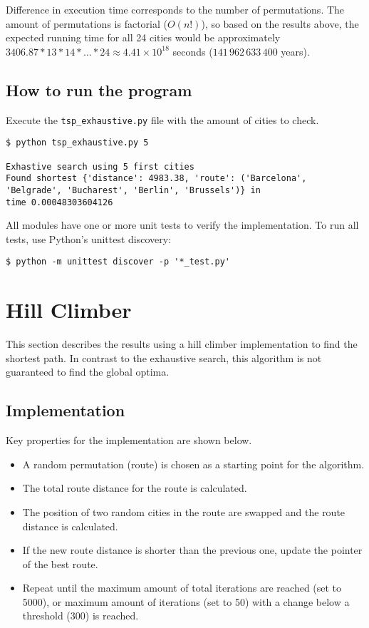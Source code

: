 \documentclass{article}
\begin{document}
\noindent Difference in execution time corresponds to the number of permutations. The amount of permutations is factorial ($O(n!)$), so based on the results above, the expected running time for all 24 cities would be approximately $3406.87 * 13 * 14 * \ldots * 24 \approx 4.41 \times 10^{18}$ seconds ($141\,962\,633\,400$ years).

\subsection*{How to run the program}

Execute the \texttt{tsp\_exhaustive.py} file with the amount of cities to check.

\begin{verbatim}
$ python tsp_exhaustive.py 5

Exhastive search using 5 first cities
Found shortest {'distance': 4983.38, 'route': ('Barcelona',
'Belgrade', 'Bucharest', 'Berlin', 'Brussels')} in
time 0.00048303604126
\end{verbatim}

\noindent All modules have one or more unit tests to verify the implementation. To run all tests, use Python's unittest discovery:

\begin{verbatim}
$ python -m unittest discover -p '*_test.py'
\end{verbatim}

\section*{Hill Climber}

This section describes the results using a hill climber implementation to find the shortest path. In contrast to the exhaustive search, this algorithm is not guaranteed to find the global optima.

\subsection*{Implementation}

Key properties for the implementation are shown below.

\begin{itemize}
    \item A random permutation (route) is chosen as a starting point for the algorithm.
    \item The total route distance for the route is calculated.
    \item The position of two random cities in the route are swapped and the route distance is calculated.
    \item If the new route distance is shorter than the previous one, update the pointer of the best route.
    \item Repeat until the maximum amount of total iterations are reached (set to 5000), or maximum amount of iterations (set to 50) with a change below a threshold (300) is reached.
\end{itemize}
\end{document}
